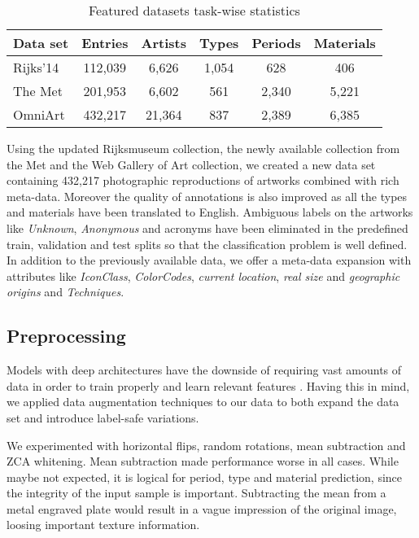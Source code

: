 \documentclass[sigconf]{acmart}
\begin{document}
\begin{table}
  \caption{Featured datasets task-wise statistics}
  \label{tab:datasets}
  \begin{tabular}{lccccc}
    \toprule
    Data set  & Entries & Artists  & Types    & Periods    & Materials  \\
    \midrule
    Rijks'14 &  112,039 & 6,626    & 1,054    & 628        & 406        \\
    The Met  &  201,953 & 6,602    & 561      & 2,340      & 5,221		\\
    OmniArt  &  432,217 & 21,364   & 837      & 2,389      & 6,385		\\
    \bottomrule
  \end{tabular}
\end{table}

Using the updated Rijksmuseum collection, the newly available collection from the Met and the Web Gallery of Art collection, we created a new data set containing 432,217 photographic reproductions of artworks combined with rich meta-data. Moreover the quality of annotations is also improved as all the types and materials have been translated to English. Ambiguous labels on the artworks like \textit{Unknown}, \textit{Anonymous} and acronyms have been eliminated in the predefined train, validation and test splits so that the classification problem is well defined. In addition to the previously available data, we offer a meta-data expansion with attributes like \textit{IconClass}\cite{couprie1983iconclass}, \textit{ColorCodes}, \textit{current location}, \textit{real size} and \textit{geographic origins} and \textit{Techniques}.  

\subsection{Preprocessing}

Models with deep architectures have the downside of requiring vast amounts of data in order to train properly and learn relevant features \cite{krizhevsky2012imagenet}. Having this in mind, we applied data augmentation techniques to our data to both expand the data set and introduce label-safe variations. 

We experimented with horizontal flips, random rotations, mean subtraction and ZCA whitening. Mean subtraction made performance worse in all cases. While maybe not expected, it is logical for period, type and material prediction, since the integrity of the input sample is important. Subtracting the mean from a metal engraved plate would result in a vague impression of the original image, loosing important texture information. 
\end{document}
